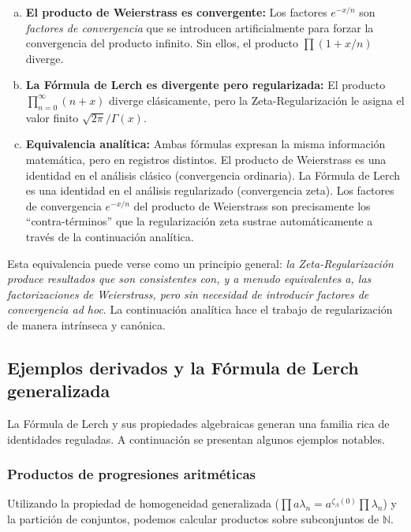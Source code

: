 \begin{enumerate}[a)]
    \item \textbf{El producto de Weierstrass es convergente:} Los factores $e^{-x/n}$ son \textit{factores de convergencia} que se introducen artificialmente para forzar la convergencia del producto infinito. Sin ellos, el producto $\prod (1 + x/n)$ diverge.
    
    \item \textbf{La Fórmula de Lerch es divergente pero regularizada:} El producto $\prod_{n=0}^{\infty} (n+x)$ diverge clásicamente, pero la Zeta-Regularización le asigna el valor finito $\sqrt{2\pi}/\Gamma(x)$. 
    
    \item \textbf{Equivalencia analítica:} Ambas fórmulas expresan la misma información matemática, pero en registros distintos. El producto de Weierstrass es una identidad en el análisis clásico (convergencia ordinaria). La Fórmula de Lerch es una identidad en el análisis regularizado (convergencia zeta). Los factores de convergencia $e^{-x/n}$ del producto de Weierstrass son precisamente los ``contra-términos'' que la regularización zeta sustrae automáticamente a través de la continuación analítica.
\end{enumerate}

Esta equivalencia puede verse como un principio general: \textit{la Zeta-Regularización produce resultados que son consistentes con, y a menudo equivalentes a, las factorizaciones de Weierstrass, pero sin necesidad de introducir factores de convergencia ad hoc}. La continuación analítica hace el trabajo de regularización de manera intrínseca y canónica.

\subsection{Ejemplos derivados y la Fórmula de Lerch generalizada}

La Fórmula de Lerch y sus propiedades algebraicas generan una familia rica de identidades reguladas. A continuación se presentan algunos ejemplos notables.

\subsubsection{Productos de progresiones aritméticas}

Utilizando la propiedad de homogeneidad generalizada ($\prod a\lambda_n = a^{\zeta_\Lambda(0)} \prod \lambda_n$) y la partición de conjuntos, podemos calcular productos sobre subconjuntos de $\mathbb{N}$.

